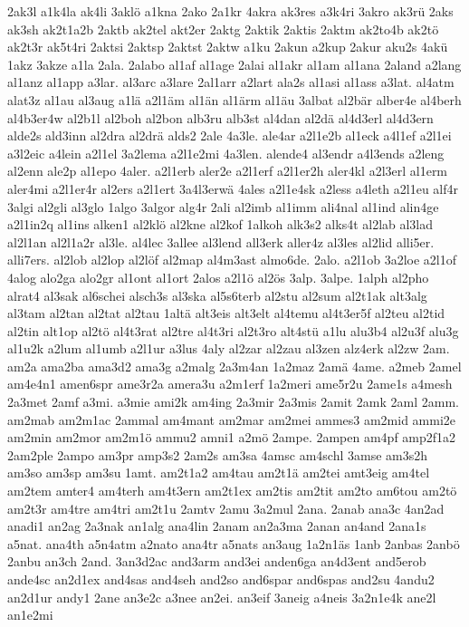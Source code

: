 {2ak3l
a1k4la
ak4li
3aklö
a1kna
2ako
2a1kr
4akra
ak3res
a3k4ri
3akro
ak3rü
2aks
ak3sh
ak2t1a2b
2aktb
ak2tel
akt2er
2aktg
2aktik
2aktis
2aktm
ak2to4b
ak2tö
ak2t3r
ak5t4ri
2aktsi
2aktsp
2aktst
2aktw
a1ku
2akun
a2kup
2akur
aku2s
4akü
1akz
3akze
a1la
2ala.
2alabo
al1af
al1age
2alai
al1akr
al1am
al1ana
2aland
a2lang
al1anz
al1app
a3lar.
al3arc
a3lare
2al1arr
a2lart
ala2s
al1asi
al1ass
a3lat.
al4atm
alat3z
al1au
al3aug
a1lä
a2l1äm
al1än
al1ärm
al1äu
3albat
al2bär
alber4e
al4berh
al4b3er4w
al2b1l
al2boh
al2bon
alb3ru
alb3st
al4dan
al2dä
al4d3erl
al4d3ern
alde2s
ald3inn
al2dra
al2drä
alds2
2ale
4a3le.
ale4ar
a2l1e2b
al1eck
a4l1ef
a2l1ei
a3l2eic
a4lein
a2l1el
3a2lema
a2l1e2mi
4a3len.
alende4
al3endr
a4l3ends
a2leng
al2enn
ale2p
al1epo
4aler.
a2l1erb
aler2e
a2l1erf
a2l1er2h
aler4kl
a2l3erl
al1erm
aler4mi
a2l1er4r
al2ers
a2l1ert
3a4l3erwä
4ales
a2l1e4sk
a2less
a4leth
a2l1eu
alf4r
3algi
al2gli
al3glo
1algo
3algor
alg4r
2ali
al2imb
al1imm
ali4nal
al1ind
alin4ge
a2l1in2q
al1ins
alken1
al2klö
al2kne
al2kof
1alkoh
alk3s2
alks4t
al2lab
al3lad
al2l1an
al2l1a2r
al3le.
al4lec
3allee
al3lend
all3erk
aller4z
al3les
al2lid
alli5er.
alli7ers.
al2lob
al2lop
al2löf
al2map
al4m3ast
almo6de.
2alo.
a2l1ob
3a2loe
a2l1of
4alog
alo2ga
alo2gr
al1ont
al1ort
2alos
a2l1ö
al2ös
3alp.
3alpe.
1alph
al2pho
alrat4
al3sak
al6schei
alsch3s
al3ska
al5s6terb
al2stu
al2sum
al2t1ak
alt3alg
al3tam
al2tan
al2tat
al2tau
1altä
alt3eis
alt3elt
al4temu
al4t3er5f
al2teu
al2tid
al2tin
alt1op
al2tö
al4t3rat
al2tre
al4t3ri
al2t3ro
alt4stü
a1lu
alu3b4
al2u3f
alu3g
al1u2k
a2lum
al1umb
a2l1ur
a3lus
4aly
al2zar
al2zau
al3zen
alz4erk
al2zw
2am.
am2a
ama2ba
ama3d2
ama3g
a2malg
2a3m4an
1a2maz
2amä
4ame.
a2meb
2amel
am4e4n1
amen6spr
ame3r2a
amera3u
a2m1erf
1a2meri
ame5r2u
2ame1s
a4mesh
2a3met
2amf
a3mi.
a3mie
ami2k
am4ing
2a3mir
2a3mis
2amit
2amk
2aml
2amm.
am2mab
am2m1ac
2ammal
am4mant
am2mar
am2mei
ammes3
am2mid
ammi2e
am2min
am2mor
am2m1ö
ammu2
amni1
a2mö
2ampe.
2ampen
am4pf
amp2f1a2
2am2ple
2ampo
am3pr
amp3s2
2am2s
am3sa
4amsc
am4schl
3amse
am3s2h
am3so
am3sp
am3su
1amt.
am2t1a2
am4tau
am2t1ä
am2tei
amt3eig
am4tel
am2tem
amter4
am4terh
am4t3ern
am2t1ex
am2tis
am2tit
am2to
am6tou
am2tö
am2t3r
am4tre
am4tri
am2t1u
2amtv
2amu
3a2mul
2ana.
2anab
ana3c
4an2ad
anadi1
an2ag
2a3nak
an1alg
ana4lin
2anam
an2a3ma
2anan
an4and
2ana1s
a5nat.
ana4th
a5n4atm
a2nato
ana4tr
a5nats
an3aug
1a2n1äs
1anb
2anbas
2anbö
2anbu
an3ch
2and.
3an3d2ac
and3arm
and3ei
anden6ga
an4d3ent
and5erob
ande4sc
an2d1ex
and4sas
and4seh
and2so
and6spar
and6spas
and2su
4andu2
an2d1ur
andy1
2ane
an3e2c
a3nee
an2ei.
an3eif
3aneig
a4neis
3a2n1e4k
ane2l
an1e2mi
}
